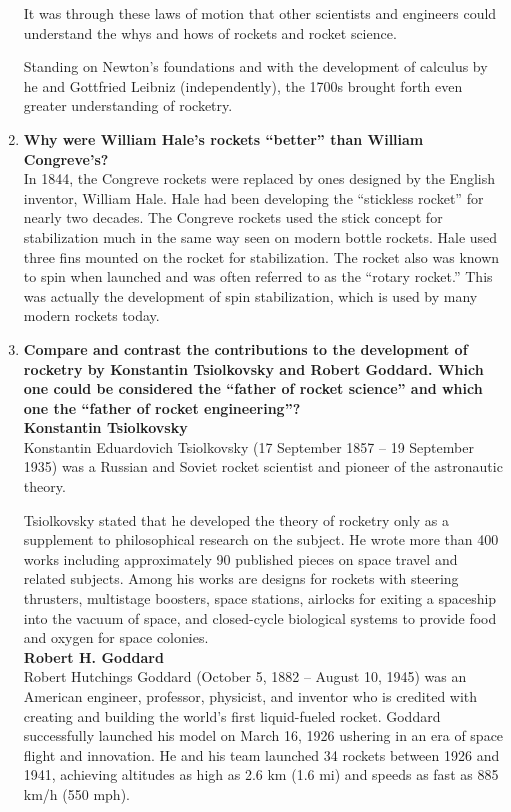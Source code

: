 \begin{enumerate}
It was through these laws of motion that other scientists and engineers could understand the whys and hows of rockets and rocket science.

Standing on Newton’s foundations and with the development of calculus by he and Gottfried Leibniz (independently), the 1700s brought forth even greater understanding of rocketry. \cite{book}
	
	\item {\bf Why were William Hale’s rockets “better” than William Congreve’s?}\\

In 1844, the Congreve rockets were replaced by ones designed by the English inventor, William Hale. Hale had been developing the “stickless rocket” for nearly two decades. The Congreve rockets used the stick concept for stabilization much in the same way seen on modern bottle rockets. Hale used three fins mounted on the rocket for stabilization. The rocket also was known to spin when launched and was often referred to as the “rotary rocket.” This was actually the development of spin stabilization, which is used by many modern rockets today. \cite{book}

	\item {\bf Compare and contrast the contributions to the development of rocketry by Konstantin Tsiolkovsky and Robert Goddard. Which one could be considered the “father of rocket science” and which one the “father of rocket engineering”?}\\
	
{\bf Konstantin Tsiolkovsky}\\
Konstantin Eduardovich Tsiolkovsky (17 September 1857  – 19 September 1935) was a Russian and Soviet rocket scientist and pioneer of the astronautic theory.

Tsiolkovsky stated that he developed the theory of rocketry only as a supplement to philosophical research on the subject. He wrote more than 400 works including approximately 90 published pieces on space travel and related subjects. Among his works are designs for rockets with steering thrusters, multistage boosters, space stations, airlocks for exiting a spaceship into the vacuum of space, and closed-cycle biological systems to provide food and oxygen for space colonies. \cite{konstantin}
\\

{\bf Robert H. Goddard}\\
Robert Hutchings Goddard (October 5, 1882 – August 10, 1945) was an American engineer, professor, physicist, and inventor who is credited with creating and building the world's first liquid-fueled rocket. Goddard successfully launched his model on March 16, 1926 ushering in an era of space flight and innovation. He and his team launched 34 rockets between 1926 and 1941, achieving altitudes as high as 2.6 km (1.6 mi) and speeds as fast as 885 km/h (550 mph).


\end{enumerate}
